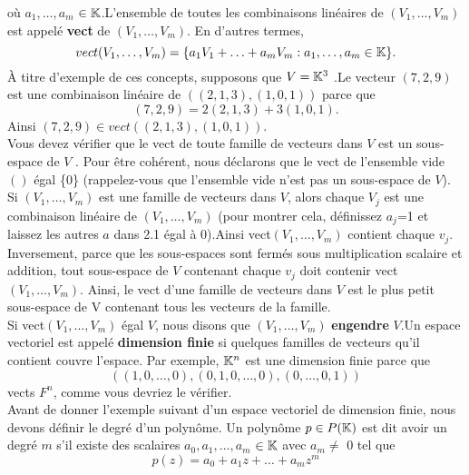 \documentclass[12pt]{book}
\begin{document}
 
où $a_1,\ldots,a_m $ $\in \mathbb{K}$.L'ensemble de toutes les combinaisons lin\'eaires de $(V_1,\ldots,V_m)$ est appel\'e \textbf{vect} de $(V_1,\ldots,V_m)$. En d'autres termes,
\begin{equation*}
vect(V_1,\ldots,V_m)=\{a_1V_1+\ldots+a_mV_m : a_1,\ldots,a_m \in \mathbb{K}\}.
\end{equation*}
\hspace{0.5cm}\`A titre d’exemple de ces concepts, supposons que $V = \mathbb{K}^3$ .Le vecteur $(7,2,9)$ est une combinaison lin\'eaire de $((2,1,3),(1,0,1))$ parce que 
\begin{equation*}
(7,2,9)=2(2,1,3) + 3(1,0,1).
\end{equation*}
Ainsi $(7,2,9) \in vect ((2,1,3), (1,0,1)).$\\
\indent
Vous devez vérifier que le vect de toute famille de vecteurs dans $V$ est un sous-espace de $V$ . Pour être cohérent, nous déclarons que le vect de l'ensemble vide $()$ \'egal \{$0$\} (rappelez-vous que l’ensemble vide n’est pas un sous-espace de $V$).\\
\indent
Si $(V_1,\ldots,V_m)$ est une famille de vecteurs dans $V$, alors chaque $V_j$ est une combinaison lin\'eaire de $(V_1,\ldots,V_m)$ (pour montrer cela, d\'efinissez $a_j$=1 et laissez les autres $a$ dans 2.1 \'egal \`a 0).Ainsi vect$(V_1,\ldots,V_m)$ contient chaque $v_j$. Inversement, parce que les sous-espaces sont ferm\'es sous multiplication scalaire et addition, tout sous-espace de $V$ contenant chaque $v_j$ doit contenir vect$(V_1,\ldots,V_m)$. Ainsi, le vect d’une famille de vecteurs dans $V$ est le plus petit sous-espace de V contenant tous les vecteurs de la famille.\\
\indent
Si vect$(V_1,\ldots,V_m)$ \'egal $V$, nous disons que $(V_1,\ldots,V_m)$ \textbf{engendre} $V$.Un espace vectoriel est appel\'e \textbf{dimension finie} si quelques familles de vecteurs qu'il contient couvre l'espace. Par exemple, $\mathbb{K}^n$ est une dimension finie parce que 
\begin{equation*}
((1,0,\ldots,0),(0,1,0,\ldots,0),(0,\ldots,0,1))
\end{equation*}
vects {$F^n$}, comme vous devriez le v\'erifier.\\
\indent 
Avant de donner l’exemple suivant d’un espace vectoriel de dimension finie, nous devons d\'efinir le degr\'e d’un polyn\^ome. Un polyn\^ome $p \in P(\mathbb{K})$ est dit avoir un degr\'e $m$ s’il existe des scalaires $a_0,a_1,\ldots,a_m $ $\in  \mathbb{K}$ avec $a_m \ne$ $0$ tel que
\begin{equation*}
 p(z) = a_0 + a_1z +\ldots+ a_mz^m   
\end{equation*}
\end{document}
